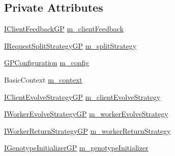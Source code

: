 \subsection*{Private Attributes}
\begin{DoxyCompactItemize}
\item 
\hyperlink{interfaceorg_1_1jgap_1_1distr_1_1grid_1_1gp_1_1_i_client_feedback_g_p}{I\-Client\-Feedback\-G\-P} \hyperlink{classorg_1_1jgap_1_1distr_1_1grid_1_1gp_1_1_grid_configuration_g_p_base_a71bf9e73bc1117b36216552648ee01c2}{m\-\_\-client\-Feedback}
\item 
\hyperlink{interfaceorg_1_1jgap_1_1distr_1_1grid_1_1gp_1_1_i_request_split_strategy_g_p}{I\-Request\-Split\-Strategy\-G\-P} \hyperlink{classorg_1_1jgap_1_1distr_1_1grid_1_1gp_1_1_grid_configuration_g_p_base_a2e20d662aa793c1e47a88b6007cf4646}{m\-\_\-split\-Strategy}
\item 
\hyperlink{classorg_1_1jgap_1_1gp_1_1impl_1_1_g_p_configuration}{G\-P\-Configuration} \hyperlink{classorg_1_1jgap_1_1distr_1_1grid_1_1gp_1_1_grid_configuration_g_p_base_ae6a106f7e93ed359430ddab70f4a0186}{m\-\_\-config}
\item 
Basic\-Context \hyperlink{classorg_1_1jgap_1_1distr_1_1grid_1_1gp_1_1_grid_configuration_g_p_base_ab378a3b0e8ad6c33c9a98c5db4758650}{m\-\_\-context}
\item 
\hyperlink{interfaceorg_1_1jgap_1_1distr_1_1grid_1_1gp_1_1_i_client_evolve_strategy_g_p}{I\-Client\-Evolve\-Strategy\-G\-P} \hyperlink{classorg_1_1jgap_1_1distr_1_1grid_1_1gp_1_1_grid_configuration_g_p_base_a04f4dea0aaafad6113137c71db1d105e}{m\-\_\-client\-Evolve\-Strategy}
\item 
\hyperlink{interfaceorg_1_1jgap_1_1distr_1_1grid_1_1gp_1_1_i_worker_evolve_strategy_g_p}{I\-Worker\-Evolve\-Strategy\-G\-P} \hyperlink{classorg_1_1jgap_1_1distr_1_1grid_1_1gp_1_1_grid_configuration_g_p_base_a46115eb65e7f8798c2105784b9c4dde3}{m\-\_\-worker\-Evolve\-Strategy}
\item 
\hyperlink{interfaceorg_1_1jgap_1_1distr_1_1grid_1_1gp_1_1_i_worker_return_strategy_g_p}{I\-Worker\-Return\-Strategy\-G\-P} \hyperlink{classorg_1_1jgap_1_1distr_1_1grid_1_1gp_1_1_grid_configuration_g_p_base_ad39cc1c51254d3bc29337ad5d3d4056b}{m\-\_\-worker\-Return\-Strategy}
\item 
\hyperlink{interfaceorg_1_1jgap_1_1distr_1_1grid_1_1gp_1_1_i_genotype_initializer_g_p}{I\-Genotype\-Initializer\-G\-P} \hyperlink{classorg_1_1jgap_1_1distr_1_1grid_1_1gp_1_1_grid_configuration_g_p_base_a49fb05ca26c12884c850b30618be5104}{m\-\_\-genotype\-Initializer}

\end{DoxyCompactItemize}
